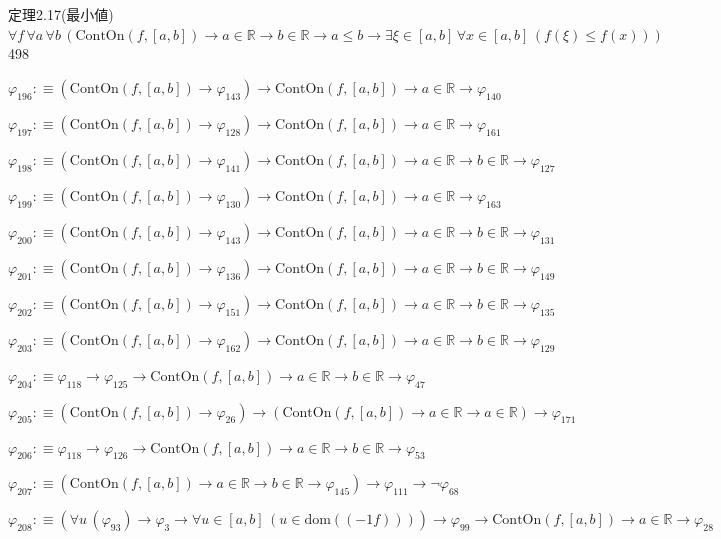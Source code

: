 \begin{fullproof}{定理2.17(最小値)}{$\forall f\,\forall a\,\forall b\,(\mathrm{ContOn}(f,[a,b]) \to a \in \mathbb{R} \to b \in \mathbb{R} \to a \leq b \to \exists \xi \in [a,b]\,\forall x \in [a,b]\,(f(\xi) \leq f(x)))$}{498}
\begin{abbrevlist}
\item $\varphi_{196} :\equiv (\mathrm{ContOn}(f,[a,b]) \to \varphi_{143}) \to \mathrm{ContOn}(f,[a,b]) \to a \in \mathbb{R} \to \varphi_{140}$
\item $\varphi_{197} :\equiv (\mathrm{ContOn}(f,[a,b]) \to \varphi_{128}) \to \mathrm{ContOn}(f,[a,b]) \to a \in \mathbb{R} \to \varphi_{161}$
\item $\varphi_{198} :\equiv (\mathrm{ContOn}(f,[a,b]) \to \varphi_{141}) \to \mathrm{ContOn}(f,[a,b]) \to a \in \mathbb{R} \to b \in \mathbb{R} \to \varphi_{127}$
\item $\varphi_{199} :\equiv (\mathrm{ContOn}(f,[a,b]) \to \varphi_{130}) \to \mathrm{ContOn}(f,[a,b]) \to a \in \mathbb{R} \to \varphi_{163}$
\item $\varphi_{200} :\equiv (\mathrm{ContOn}(f,[a,b]) \to \varphi_{143}) \to \mathrm{ContOn}(f,[a,b]) \to a \in \mathbb{R} \to b \in \mathbb{R} \to \varphi_{131}$
\item $\varphi_{201} :\equiv (\mathrm{ContOn}(f,[a,b]) \to \varphi_{136}) \to \mathrm{ContOn}(f,[a,b]) \to a \in \mathbb{R} \to b \in \mathbb{R} \to \varphi_{149}$
\item $\varphi_{202} :\equiv (\mathrm{ContOn}(f,[a,b]) \to \varphi_{151}) \to \mathrm{ContOn}(f,[a,b]) \to a \in \mathbb{R} \to b \in \mathbb{R} \to \varphi_{135}$
\item $\varphi_{203} :\equiv (\mathrm{ContOn}(f,[a,b]) \to \varphi_{162}) \to \mathrm{ContOn}(f,[a,b]) \to a \in \mathbb{R} \to b \in \mathbb{R} \to \varphi_{129}$
\item $\varphi_{204} :\equiv \varphi_{118} \to \varphi_{125} \to \mathrm{ContOn}(f,[a,b]) \to a \in \mathbb{R} \to b \in \mathbb{R} \to \varphi_{47}$
\item $\varphi_{205} :\equiv (\mathrm{ContOn}(f,[a,b]) \to \varphi_{26}) \to (\mathrm{ContOn}(f,[a,b]) \to a \in \mathbb{R} \to a \in \mathbb{R}) \to \varphi_{171}$
\item $\varphi_{206} :\equiv \varphi_{118} \to \varphi_{126} \to \mathrm{ContOn}(f,[a,b]) \to a \in \mathbb{R} \to b \in \mathbb{R} \to \varphi_{53}$
\item $\varphi_{207} :\equiv (\mathrm{ContOn}(f,[a,b]) \to a \in \mathbb{R} \to b \in \mathbb{R} \to \varphi_{145}) \to \varphi_{111} \to \neg \varphi_{68}$
\item $\varphi_{208} :\equiv (\forall u\,(\varphi_{93}) \to \varphi_{3} \to \forall u \in [a,b]\,(u \in \mathrm{dom}((-1 f)))) \to \varphi_{99} \to \mathrm{ContOn}(f,[a,b]) \to a \in \mathbb{R} \to \varphi_{28}$

\end{abbrevlist}
\end{fullproof}

